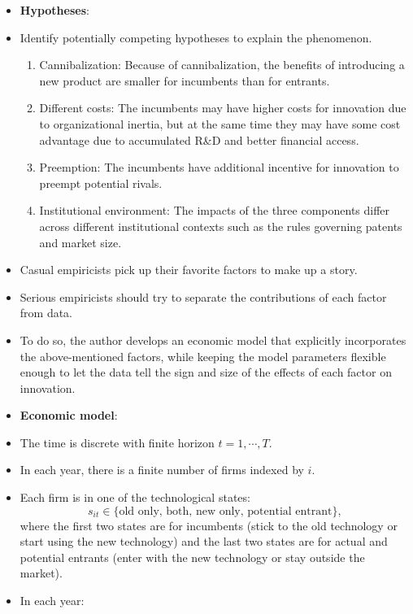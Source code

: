 \documentclass[
]{book}
\providecommand{\tightlist}{%
  \setlength{\itemsep}{0pt}\setlength{\parskip}{0pt}}
\begin{document}
\begin{itemize}
\item
  \textbf{Hypotheses}:
\item
  Identify potentially competing hypotheses to explain the phenomenon.

  \begin{enumerate}
  \def\labelenumi{\arabic{enumi}.}
  \tightlist
  \item
    Cannibalization: Because of cannibalization, the benefits of introducing a new product are smaller for incumbents than for entrants.
  \item
    Different costs: The incumbents may have higher costs for innovation due to organizational inertia, but at the same time they may have some cost advantage due to accumulated R\&D and better financial access.
  \item
    Preemption: The incumbents have additional incentive for innovation to preempt potential rivals.
  \item
    Institutional environment: The impacts of the three components differ across different institutional contexts such as the rules governing patents and market size.
  \end{enumerate}
\item
  Casual empiricists pick up their favorite factors to make up a story.
\item
  Serious empiricists should try to separate the contributions of each factor from data.
\item
  To do so, the author develops an economic model that explicitly incorporates the above-mentioned factors, while keeping the model parameters flexible enough to let the data tell the sign and size of the effects of each factor on innovation.
\item
  \textbf{Economic model}:
\item
  The time is discrete with finite horizon \(t = 1, \cdots, T\).
\item
  In each year, there is a finite number of firms indexed by \(i\).
\item
  Each firm is in one of the technological states:
  \begin{equation}
  s_{it} \in \{\text{old only, both, new only, potential entrant}\},
  \end{equation}
  where the first two states are for incumbents (stick to the old technology or start using the new technology) and the last two states are for actual and potential entrants (enter with the new technology or stay outside the market).
\item
  In each year:


\end{itemize}
\end{document}

